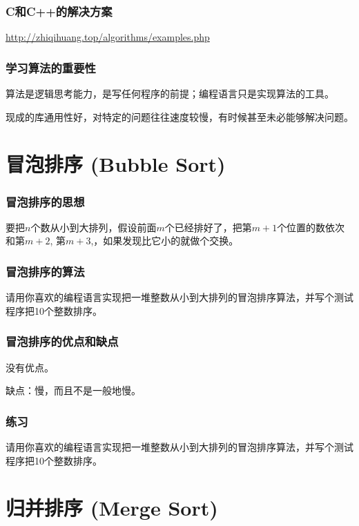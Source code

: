 \documentclass[CJK,14pt]{beamer}
\begin{document}
  \begin{frame}
\frametitle{C和C++的解决方案}


\url{http://zhiqihuang.top/algorithms/examples.php}

  \end{frame}
  
  \begin{frame}
    \frametitle{学习算法的重要性}
    \bitem
  \item{算法是逻辑思考能力，是写任何程序的前提；编程语言只是实现算法的工具。}
  \item{现成的库通用性好，对特定的问题往往速度较慢，有时候甚至未必能够解决问题。}
    \eitem
  \end{frame}
  
  
  \section{冒泡排序 (Bubble Sort)}

  \begin{frame}
    \frametitle{冒泡排序的思想}
    
    要把$n$个数从小到大排列，假设前面$m$个已经排好了，把第$m+1$个位置的数依次和第$m+2$, 第$m+3$,，如果发现比它小的就做个交换。
  \end{frame}


  \begin{frame}
    \frametitle{冒泡排序的算法}
    
    请用你喜欢的编程语言实现把一堆整数从小到大排列的冒泡排序算法，并写个测试程序把10个整数排序。
  \end{frame}


    \begin{frame}
    \frametitle{冒泡排序的优点和缺点}
    \bitem
  \item{没有优点。}
  \item{缺点：慢，而且不是一般地慢。}
    \eitem
    \end{frame}


  \begin{frame}
    \frametitle{练习}
    
    请用你喜欢的编程语言实现把一堆整数从小到大排列的冒泡排序算法，并写个测试程序把10个整数排序。
  \end{frame}
    
  
  
  \section{归并排序 (Merge Sort)}
\end{document}
